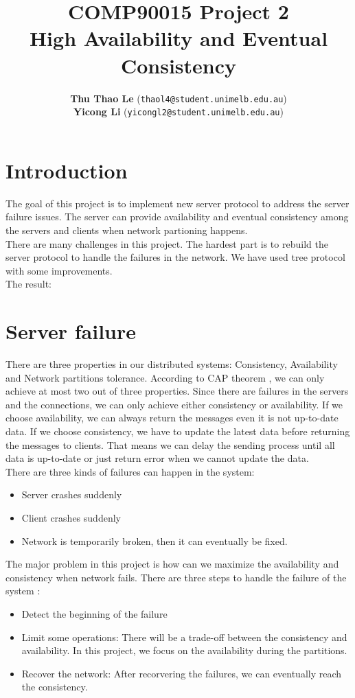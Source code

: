 \documentclass[10pt,twocolumn]{article}
\title{\textbf{COMP90015 Project 2 \\ High Availability and Eventual Consistency\\}}
\author{\textbf{Thu Thao Le} (\texttt{thaol4@student.unimelb.edu.au})
\\[2ex] \textbf{Yicong Li} (\texttt{yicongl2@student.unimelb.edu.au})}
\date{}
\begin{document}
\maketitle

\section{Introduction}
The goal of this project is to implement new server protocol to address the server failure issues. The server can provide availability and eventual consistency among the servers and clients when network partioning happens. \\

There are many challenges in this project. The hardest part is to rebuild the server protocol to handle the failures in the network. We have used tree protocol with some improvements. \\

The result:

\section{Server failure}
There are three properties in our distributed systems: Consistency, Availability and Network partitions tolerance. According to CAP theorem \cite{eric}, we can only achieve at most two out of three properties. Since there are failures in the servers and the connections, we can only achieve either consistency or availability. If we choose availability, we can always return the messages even it is not up-to-date data. If we choose consistency, we have to update the latest data before returning the messages to clients. That means we can delay the sending process until all data is up-to-date or just return error when we cannot update the data. \\

There are three kinds of failures can happen in the system:
\begin{itemize}
\item Server crashes suddenly
\item Client crashes suddenly
\item Network is temporarily broken, then it can eventually be fixed.
\end{itemize}

The major problem in this project is how can we maximize the availability and consistency when network fails. There are three steps to handle the failure of the system \cite{eric12}:
\begin{itemize}
\item Detect the beginning of the failure
\item Limit some operations: There will be a trade-off between the consistency and availability. In this project, we focus on the availability during the partitions.
\item Recover the network: After recorvering the failures, we can eventually reach the consistency. 
\end{itemize}
\end{document}
